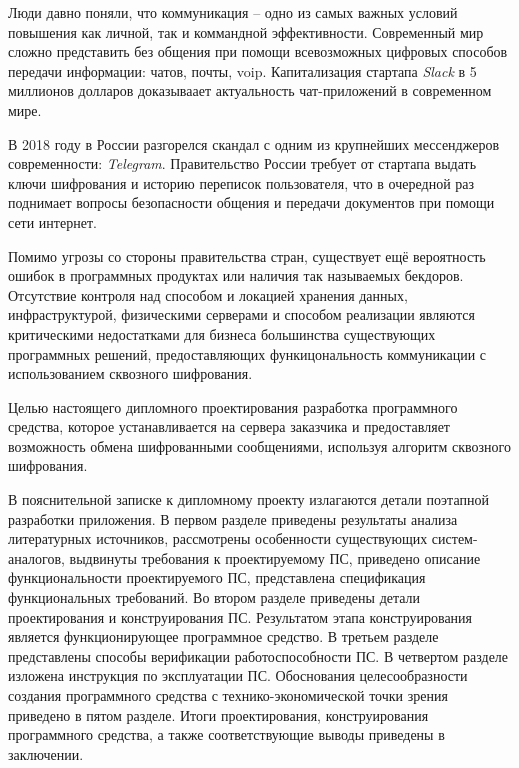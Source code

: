 
Люди давно поняли, что коммуникация -- одно из самых важных условий повышения как личной, так и коммандной эффективности. Современный мир сложно представить без общения при помощи всевозможных цифровых способов передачи информации: чатов, почты, \gls{voip}. Капитализация стартапа \textit{Slack} в 5 миллионов долларов \cite{slack:capitalization} доказываает актуальность чат-приложений в современном мире.

В 2018 году в России разгорелся скандал с одним из крупнейших мессенджеров современности: \textit{Telegram}. Правительство России требует от стартапа выдать ключи шифрования и историю переписок пользователя, что в очередной раз поднимает вопросы безопасности общения и передачи документов при помощи сети интернет. \cite{telegram:vs:rkn}

Помимо угрозы со стороны правительства стран, существует ещё вероятность ошибок в программных продуктах или наличия так называемых бекдоров. Отсутствие контроля над способом и локацией хранения данных, инфраструктурой, физическими серверами и способом реализации являются критическими недостатками для бизнеса большинства существующих программных решений, предоставляющих функицональность коммуникации с использованием сквозного шифрования.

Целью настоящего дипломного проектирования разработка программного средства, которое устанавливается на сервера заказчика и предоставляет возможность обмена шифрованными сообщениями, используя алгоритм сквозного шифрования.

В пояснительной записке к дипломному проекту излагаются детали поэтапной разработки приложения. В первом разделе приведены результаты анализа литературных источников, рассмотрены особенности существующих систем-аналогов, выдвинуты требования к проектируемому ПС, приведено описание функциональности проектируемого ПС, представлена спецификация функциональных требований. Во втором разделе приведены детали проектирования и конструирования ПС. Результатом этапа конструирования является функционирующее программное средство. В третьем разделе представлены способы верификации работоспособности ПС. В четвертом разделе изложена инструкция по эксплуатации ПС. Обоснования целесообразности создания программного средства с технико-экономической точки зрения приведено в пятом разделе. Итоги проектирования, конструирования программного средства, а также соответствующие выводы приведены в заключении.